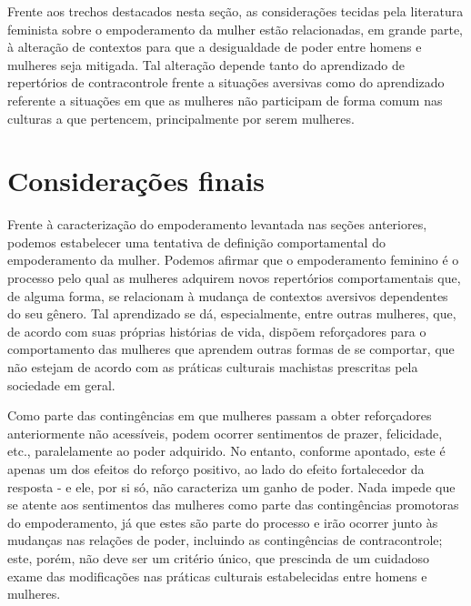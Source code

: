 Frente aos trechos destacados nesta seção, as considerações tecidas pela literatura feminista sobre o empoderamento da mulher estão relacionadas, em grande parte, à alteração de contextos para que a desigualdade de poder entre homens e mulheres seja mitigada. Tal alteração depende tanto do aprendizado de repertórios de contracontrole frente a situações aversivas como do aprendizado referente a situações em que as mulheres não participam de forma comum nas culturas a que pertencem, principalmente por serem mulheres.

\section{Considerações finais}

Frente à caracterização do empoderamento levantada nas seções anteriores, podemos estabelecer uma tentativa de definição comportamental do empoderamento da mulher. Podemos afirmar que o empoderamento feminino é o processo pelo qual as mulheres adquirem novos repertórios comportamentais que, de alguma forma, se relacionam à mudança de contextos aversivos dependentes do seu gênero. Tal aprendizado se dá, especialmente, entre outras mulheres, que, de acordo com suas próprias histórias de vida, dispõem reforçadores para o comportamento das mulheres que aprendem outras formas de se comportar, que não estejam de acordo com as práticas culturais machistas prescritas pela sociedade em geral.

Como parte das contingências em que mulheres passam a obter reforçadores anteriormente não acessíveis, podem ocorrer sentimentos de prazer, felicidade, etc., paralelamente ao poder adquirido. No entanto, conforme apontado, este é apenas um dos efeitos do reforço positivo, ao lado do efeito fortalecedor da resposta - e ele, por si só, não caracteriza um ganho de poder. Nada impede que se atente aos sentimentos das mulheres como parte das contingências promotoras do empoderamento, já que estes são parte do processo e irão ocorrer junto às mudanças nas relações de poder, incluindo as contingências de contracontrole; este, porém, não deve ser um critério único, que prescinda de um cuidadoso exame das modificações nas práticas culturais estabelecidas entre homens e mulheres.

